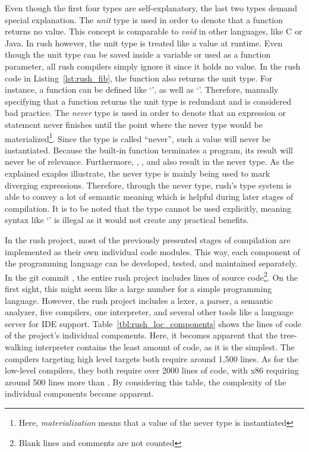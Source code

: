 Even though the first four types are self-explanatory, the last two types demand special explanation.
The \emph{unit} type is used in order to denote that a function returns no value.
This concept is comparable to \emph{void} in other languages, like C or Java.
In rush however, the unit type is treated like a value at runtime.
Even though the unit type can be saved inside a variable or used as a function parameter, all rush compilers simply ignore it since it holds no value.
In the rush code in Listing~\ref{lst:rush_fib}, the  function also returns the unit type.
For instance, a function  can be defined like `', as well as `'.
Therefore, manually specifying that a function returns the unit type is redundant and is considered bad practice.
The \emph{never} type is used in order to denote that an expression or statement never finishes until the point where the never type would be materialized\footnote{Here, \emph{materialization} means that a value of the never type is instantiated}.
Since the type is called \enquote{never}, such a value will never be instantiated.
Because the built-in  function terminates a program, its result will never be of relevance.
Furthermore, , , and  also result in the never type.
As the explained exaples illustrate, the never type is mainly being used to mark diverging expressions.
Therefore, through the never type, rush's type system is able to convey a lot of semantic meaning which is helpful during later stages of compilation.
It is to be noted that the type cannot be used explicitly, meaning syntax like `' is illegal as it would not create any practical benefits.

In the rush project, most of the previously presented stages of compilation are implemented as their own individual code modules.
This way, each component of the programming language can be developed, tested, and maintained separately.
In the git commit \rushCommit{}, the entire rush project includes
 lines of source code\footnote{Blank lines and comments are not counted}.
On the first sight, this might seem like a large number for a simple programming language.
However, the rush project includes a lexer, a parser, a semantic analyzer, five compilers, one interpreter, and several other tools like a language server for IDE support.
Table~\ref{tbl:rush_loc_components} shows the lines of code of the project's individual components.
Here, it becomes apparent that the tree-walking interpreter contains the least amount of code, as it is the simplest.
The compilers targeting high level targets both require around 1,500 lines.
As for the low-level compilers, they both require over 2000 lines of code, with x86 requiring around 500 lines more than \riscv{}.
By considering this table, the complexity of the individual components become apparent.
